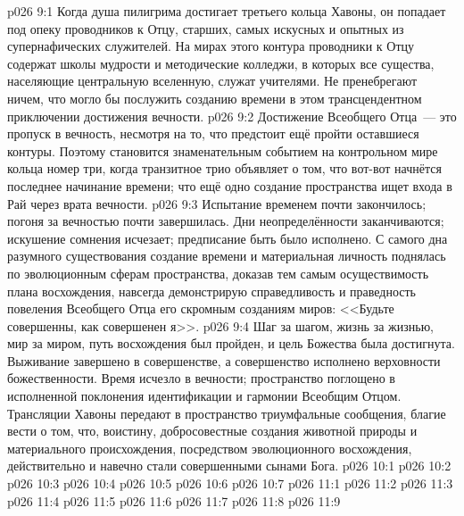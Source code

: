 \vs p026 9:1 Когда душа пилигрима достигает третьего кольца Хавоны, он попадает под опеку проводников к Отцу, старших, самых искусных и опытных из супернафических служителей. На мирах этого контура проводники к Отцу содержат школы мудрости и методические колледжи, в которых все существа, населяющие центральную вселенную, служат учителями. Не пренебрегают ничем, что могло бы послужить созданию времени в этом трансцендентном приключении достижения вечности.
\vs p026 9:2 Достижение Всеобщего Отца~--- это пропуск в вечность, несмотря на то, что предстоит ещё пройти оставшиеся контуры. Поэтому становится знаменательным событием на контрольном мире кольца номер три, когда транзитное трио объявляет о том, что вот\hyp{}вот начнётся последнее начинание времени; что ещё одно создание пространства ищет входа в Рай через врата вечности.
\vs p026 9:3 \pc Испытание временем почти закончилось; погоня за вечностью почти завершилась. Дни неопределённости заканчиваются; искушение сомнения исчезает; предписание быть  было исполнено. С самого дна разумного существования создание времени и материальная личность поднялась по эволюционным сферам пространства, доказав тем самым осуществимость плана восхождения, навсегда демонстрирую справедливость и праведность повеления Всеобщего Отца его скромным созданиям миров: <<Будьте совершенны, как совершенен я>>.
\vs p026 9:4 Шаг за шагом, жизнь за жизнью, мир за миром, путь восхождения был пройден, и цель Божества была достигнута. Выживание завершено в совершенстве, а совершенство исполнено верховности божественности. Время исчезло в вечности; пространство поглощено в исполненной поклонения идентификации и гармонии Всеобщим Отцом. Трансляции Хавоны передают в пространство триумфальные сообщения, благие вести о том, что, воистину, добросовестные создания животной природы и материального происхождения, посредством эволюционного восхождения, действительно и навечно стали совершенными сынами Бога.
\vs p026 10:1 
\vs p026 10:2 \pc 
\vs p026 10:3 
\vs p026 10:4 
\vs p026 10:5 
\vs p026 10:6 
\vs p026 10:7 
\vs p026 11:1 
\vs p026 11:2 \pc 
\vs p026 11:3 
\vs p026 11:4 
\vs p026 11:5 \pc 
\vs p026 11:6 \pc 
\vs p026 11:7 
\vs p026 11:8 
\vsetoff
\vs p026 11:9 
\quizlink
